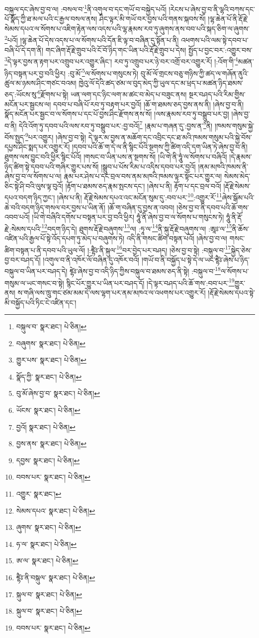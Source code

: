 བསྐུལ་དང་ཞེས་བྱ་བ་ལ། :བསལ་བ་\footnote{བསྐུལ་བ་  སྣར་ཐང་།  པེ་ཅིན། }ནི་འགུལ་བ་དང་གཡོ་བ་བསྐྱེད་པའོ། །རེངས་པ་ཞེས་བྱ་བ་ནི་ལྷའི་བཀས་དང་པོ་སྣོད་ཀྱི་ཐ་མལ་པའི་ང་རྒྱལ་བསལ་ནས། ཤིང་ལྟར་མི་གཡོ་བར་བྱས་པའི་གནས་སྐབས་སོ། །ལྷ་ཆེན་པོ་ནི་རྡོ་རྗེ་སེམས་དཔའ་ལ་སོགས་པ་འཇིག་རྟེན་ལས་འདས་པའི་ལྷ་རྣམས་རབ་ཏུ་ཞུགས་ནས་བབ་པའི་སྐད་ཅིག་ལ་ཞུགས་\footnote{བཞུགས་  སྣར་ཐང་།  པེ་ཅིན། }པའོ། །ལྷ་ཆེན་པོ་དེས་འདས་པ་ལ་སོགས་པའི་དོན་ཇི་ལྟ་བ་བཞིན་དུ་སྟོན་པ་ནི། འཕགས་པའི་ལམ་སྟེ་དབབ་པ་བཞི་པོ་དེ་དག་ནི། གང་ཞིག་རྡོ་རྗེ་གྲུབ་པའི་ངོ་བོ་ཉིད་གང་ཡིན་པའི་རྡོ་རྗེ་གྲུབ་པ་དེས། སྤྱོད་པ་བྱང་བར་:འགྱུར་བས་\footnote{གྱུར་པས་  སྣར་ཐང་།  པེ་ཅིན། }དེ་ལྟར་བྱས་ན་རྟག་པར་འགྲུབ་པར་འགྱུར་ཞིང་། རབ་ཏུ་འགྲུབ་པར་ཉེ་བར་འགྲོ་བར་འགྱུར་རོ། །:འོག་གི་\footnote{སྣོད་ཀྱི་  སྣར་ཐང་།  པེ་ཅིན། }མཚན་ཉིད་བསྟན་པར་བྱ་བའི་ཕྱིར། :བུ་མོ་\footnote{བུ་མོ་ཞེས་བྱ་བ་  སྣར་ཐང་།  པེ་ཅིན། }ལ་སོགས་པ་གསུངས་ཏེ། བུ་མོ་ལོ་གྲངས་བཅུ་གཉིས་ཀྱི་ཚད་ལ་གཞོན་ནུའི་ཚུལ་མ་ཉམས་ཤིང་གཙང་བའམ། ཁྱེའུ་ལོ་དེའི་ཚད་ཙམ་ལ་བུད་མེད་ཀྱི་ཡུལ་དང་མ་ཕྲད་པ་མཚན་ཉིད་ཐམས་ཅད་:ཡོངས་སུ་\footnote{ཡོངས་  སྣར་ཐང་།  པེ་ཅིན། }རྫོགས་པ་སྟེ། ཡན་ལག་དང་ཉིང་ལག་མ་ཚང་བ་མེད་པ་བཟུང་ནས། སྔར་བཤད་པའི་རིམ་གྱིས་མངོན་པར་སྦྱངས་ལ། དབབ་པ་བཞི་པོ་རབ་ཏུ་བརྟག་པར་བྱའོ། །ཆོ་ག་ཐམས་ཅད་བྱས་ནས་ནི། །ཞེས་བྱ་བ་ནི། སྣོད་མངོན་པར་སྦྱང་བ་ལ་སོགས་པ་དང་པོ་བྱས་ཤིང་རྫོགས་ནས་སོ། །ལས་རྣམས་རབ་ཏུ་བསྒྲུབ་པར་བྱ། །ཞེས་བྱ་བ་ནི། དེའི་འོག་ཏུ་དབབ་པའི་ལས་རབ་ཏུ་བསྒྲུབ་པར་:བྱ་བའོ།\footnote{བྱའོ།  སྣར་ཐང་།  པེ་ཅིན། } །རྣམ་པ་གཞན་དུ་:བྱས་ན་\footnote{བྱས་ནས་  སྣར་ཐང་།  པེ་ཅིན། }ནི། །ཁམས་གསུམ་སྐྱེ་བོས་སྤྱད་\footnote{དབྱས་  སྣར་ཐང་།  པེ་ཅིན། }པར་འགྱུར། །ཞེས་བྱ་བ་སྟེ། དེ་ལྟར་མ་བྱས་ན་མཆོག་དང་འབྲིང་དང་ཐ་མའི་ཁམས་གསུམ་པའི་སྐྱེ་བོས་དཔྱས་ཤིང་སྨད་པར་འགྱུར་རོ། །དབབ་པའི་ཆོ་ག་དེ་ལ་ནི་སྙིང་པོའི་སྔགས་ཀྱི་ཚིག་འདི་དག་ཡིན་ཏེ་ཞེས་བྱ་བ་ནི། ཐུགས་ལས་བྱུང་བའི་ཕྱིར་སྙིང་པོའོ། །གསང་བ་ཡིན་པས་ན་སྔགས་སོ། །ཡི་གེ་ནི་ཧཱུཾ་ལ་སོགས་པ་བཞིའོ། །དེ་རྣམས་ཉིད་ཚིག་སྟེ་དབབ་པའི་གཞིར་གྱུར་པས་སོ། །སྒྲུབ་པ་པོས་རིམ་པ་འདིས་དབབ་པར་བྱའོ། །ནམ་མཁའི་ཁམས་ནི་ཞེས་བྱ་བ་ལ་སོགས་པ་ལ། རྣམ་པར་ཤེས་པ་དང་བྲལ་བས་ནམ་མཁའི་ཁམས་ལྟར་སྟོང་པར་གྱུར་ལ། སེམས་མེད་ཅིང་སྟེ་ཤི་བའི་ལུས་ལྟ་བུའོ། །རྟོག་པ་ཐམས་ཅད་རྣམ་སྤངས་དང་། །ཞེས་པ་ནི། རྟོག་པ་དང་བྲལ་བའོ། །རྡོ་རྗེ་སེམས་དཔའ་བདག་ཉིད་ཀྱང་། །ཞེས་པ་ནི། རྡོ་རྗེ་སེམས་དཔའ་འང་མངོན་སུམ་དུ་:བབ་པར་\footnote{བབས་པར་  སྣར་ཐང་།  པེ་ཅིན། }:འགྱུར་རོ་\footnote{འགྱུར་  སྣར་ཐང་། }ཞེས་སྒོམ་པའི་ཆེ་བའི་བདག་ཉིད་གསལ་བར་བྱས་པ་ཡིན་ནོ། །ཆོ་ག་བཞིན་དུ་བྱས་ན་འབབ། །ཅེས་བྱ་བ་ནི་དབབ་པའི་ཆོ་གས་འབབ་པའོ། །ཡི་གེ་བཞིའི་དགོས་པ་བསྟན་པར་བྱ་བའི་ཕྱིར། ཧཱུཾ་ནི་ཞེས་བྱ་བ་ལ་སོགས་པ་གསུངས་ཏེ། ཧཱུཾ་ནི་རྡོ་རྗེ་:སེམས་དཔའི་\footnote{སེམས་དཔའ་  སྣར་ཐང་།  པེ་ཅིན། }བདག་ཉིད་དེ། ཐུགས་རྡོ་རྗེ་བཞུགས་\footnote{ཞུགས་  སྣར་ཐང་།  པེ་ཅིན། }ལ། :ཧཱ་ལ་\footnote{ཧ་ལ་  སྣར་ཐང་།  པེ་ཅིན། }ནི་སྐུ་རྡོ་རྗེ་བཞུགས་ལ། :ཨཱཿ་ལ་\footnote{ཨ་ལ་  སྣར་ཐང་།  པེ་ཅིན། }ནི་ཆོས་འཛིན་པའི་རྒྱལ་པོ་སྟེ་འོད་དཔག་ཏུ་མེད་པ་བཞུགས་ཏེ། འདི་ནི་གསང་ཚིག་བསྟན་པའོ། །ཞེས་བྱ་བ་ལ། གསང་ཚིག་བསྟན་པ་ནི་དབབ་པའི་ཡུལ་ལོ། །:ཛྷཻཿ་ནི་སྐུལ་\footnote{ཛྷཻཿ་ནི་བསྐུལ་  སྣར་ཐང་།  པེ་ཅིན། }བར་བྱེད་པར་བཤད། །ཅེས་བྱ་བ་སྟེ། :བསྐུལ་བ་\footnote{སྐུལ་བ་  སྣར་ཐང་།  པེ་ཅིན། }སྐྱེད་ཅེས་བྱ་བར་བཤད་དོ། །འགུལ་བ་ནི་འཁོར་ལོ་བཞིན་དུ་འཁོར་བའོ། །གཡོ་བ་ནི་བསྐྱོད་པ་སྟེ་དེ་ལ་ཡང་ཛྷཻཿ་ཞེས་པ་ཉིད་བསྐུལ་བ་ཡིན་པར་བཤད་དེ། ཛྷེཿ་ཞེས་བྱ་བ་འདི་ཉིད་ཀྱིས་བསྐུལ་བ་ཐམས་ཅད་ནི་སྟེ། :བསྐུལ་བ་\footnote{སྐུལ་བ་  སྣར་ཐང་།  པེ་ཅིན། }ལ་སོགས་པ་གསུམ་ལ་ཡང་གསང་བ་སྟེ། སྙིང་པོར་གྱུར་པ་ཡིན་པར་བཤད་དོ། །དེ་ལྟར་བཤད་པའི་ཆོ་གས་:བབ་པར་\footnote{བབས་པར་  སྣར་ཐང་།  པེ་ཅིན། }གྱུར་ནས། ས་གཞི་ལས་ཁྲུ་གང་ཙམ་མམ་དེ་ལས་ལྷག་པར་ནམ་མཁའ་ལ་འཕགས་པར་འགྱུར་རོ། །རྡོ་རྗེ་སེམས་དཔའ་སྟེ་མི་བསྐྱོད་པའི་ཏིང་ངེ་འཛིན་དང་། 